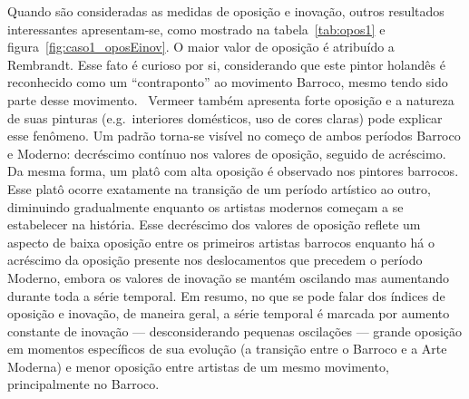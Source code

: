 Quando são consideradas as medidas de oposição e inovação, outros
resultados interessantes apresentam-se, como mostrado na
tabela~\ref{tab:opos1} e figura~\ref{fig:caso1_oposEinov}. O maior
valor de oposição é atribuído a Rembrandt. Esse fato é curioso por si,
considerando que este pintor holandês é reconhecido como um
``contraponto'' ao movimento Barroco, mesmo tendo sido parte desse
movimento.~\cite{gombrich} Vermeer também apresenta forte oposição e a
natureza de suas pinturas (e.g.\ interiores domésticos, uso de cores
claras) pode explicar esse fenômeno. Um padrão torna-se visível no
começo de ambos períodos Barroco e Moderno: decréscimo contínuo nos
valores de oposição, seguido de acréscimo. Da mesma forma, um platô
com alta oposição é observado nos pintores barrocos. Esse platô ocorre
exatamente na transição de um período artístico ao outro, diminuindo
gradualmente enquanto os artistas modernos começam a se estabelecer na
história. Esse decréscimo dos valores de oposição reflete um aspecto
de baixa oposição entre os primeiros artistas barrocos enquanto há o
acréscimo da oposição presente nos deslocamentos que precedem o
período Moderno, embora os valores de inovação se mantém oscilando mas
aumentando durante toda a série temporal. Em resumo, no que se pode
falar dos índices de oposição e inovação, de maneira geral,
a série temporal é marcada por aumento constante de
inovação --- desconsiderando pequenas oscilações --- grande oposição em momentos específicos de sua evolução (a
transição entre o Barroco e a Arte Moderna) e menor oposição entre
artistas de um mesmo movimento, principalmente no Barroco.

